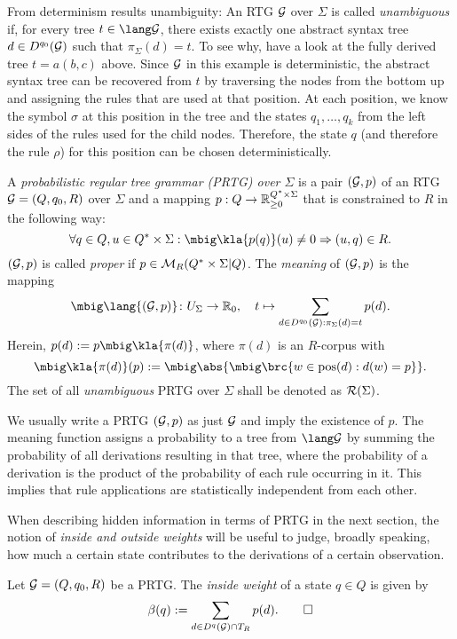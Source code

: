 \label{lemma:02-deterministic-is-unambiguous}
From determinism results unambiguity: An RTG $\mathcal G$ over $\Sigma$ is called
\emph{unambiguous} if, for every tree $t\in\lang\ug$, there exists exactly one
abstract syntax tree $d\in D^{q_0}(\mathcal G)$ such that $\pi_\Sigma(d) = t$. To see why, have
a look at the fully derived tree $t = a(b,c)$ above. Since $\mathcal G$ in this
example is deterministic, the abstract syntax tree can be recovered from $t$ by
traversing the nodes from the bottom up and assigning the rules that are used
at that position. At each position, we know the symbol $\sigma$ at this
position in the tree and the states $q_1,\ldots,q_k$ from the left sides of the
rules used for the child nodes. Therefore, the state $q$ (and therefore the
rule $\rho$) for this position can be chosen deterministically.

\begin{definition}
 A \emph{probabilistic regular tree grammar (PRTG) over $\Sigma$} is a pair
 $(\mathcal G,p)$ of an RTG $\mathcal G=(Q,q_0,R)$ over $\Sigma$ and a mapping
 $p:Q\to\mathbb R_{\geq0}^{Q^*\times\Sigma}$ that is constrained to $R$ in the
 following way:
 \[
  \forall q\in Q, u\in Q^*\times\Sigma: \mbig\kla{p(q)}(u) \neq 0 \Rightarrow (u,q) \in R.
 \]
 $(\mathcal G,p)$ is called \emph{proper} if $p\in\mathcal M_R(Q^*\times\Sigma|Q)$. The
 \emph{meaning} of $(\mathcal G,p)$ is the mapping
 \[
  \mbig\lang{(\ug,p)}\colon U_\Sigma \to \zr_0, \quad
  t \mapsto \sum_{d\in D^{q_0}(\ug): \pi_\Sigma(d)=t} p(d).
 \]
 Herein, $p(d) := p\mbig\kla{\pi(d)}$, where $\pi(d)$ is an $R$-corpus with
 \[
  \mbig\kla{\pi(d)}(p) := \mbig\abs{\mbig\brc{w\in\pos(d): d(w)=p}}.
 \]
 The set of all \emph{unambiguous} PRTG over $\Sigma$ shall be denoted as $\mathcal R(\Sigma)$.
\end{definition}

We usually write a PRTG $(\mathcal G,p)$ as just $\mathcal G$ and imply the existence of $p$.
The meaning function assigns a probability to a tree from $\lang\ug$ by summing
the probability of all derivations resulting in that tree, where the
probability of a derivation is the product of the probability of each rule
occurring in it. This implies that rule applications are statistically
independent from each other.

When describing hidden information in terms of PRTG in the next section, the
notion of \emph{inside and outside weights} will be useful to judge, broadly
speaking, how much a certain state contributes to the derivations of a certain
observation.

\begin{definition}
 Let $\mathcal G = (Q,q_0,R)$ be a PRTG. The \emph{inside weight} of a state $q\in Q$
 is given by
 \[
  \beta(q) := \sum_{d\in D^q(\mathcal G)\cap T_R} p(d).
  \qedhere
 \]
\end{definition}

